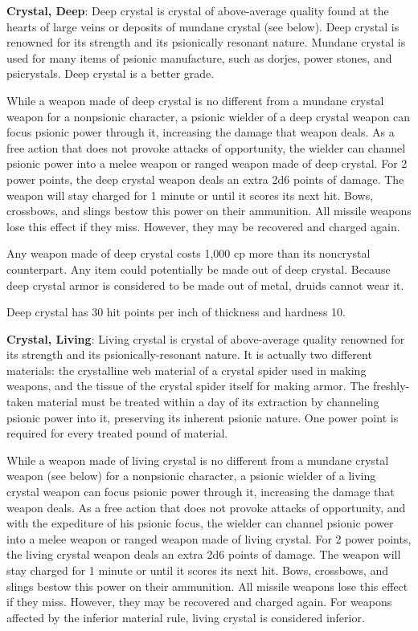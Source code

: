 \textbf{Crystal, Deep}: Deep crystal is crystal of above-average quality found at the hearts of large veins or deposits of mundane crystal (see below). Deep crystal is renowned for its strength and its psionically resonant nature. Mundane crystal is used for many items of psionic manufacture, such as dorjes, power stones, and psicrystals. Deep crystal is a better grade.

While a weapon made of deep crystal is no different from a mundane crystal weapon for a nonpsionic character, a psionic wielder of a deep crystal weapon can focus psionic power through it, increasing the damage that weapon deals. As a free action that does not provoke attacks of opportunity, the wielder can channel psionic power into a melee weapon or ranged weapon made of deep crystal. For 2 power points, the deep crystal weapon deals an extra 2d6 points of damage. The weapon will stay charged for 1 minute or until it scores its next hit. Bows, crossbows, and slings bestow this power on their ammunition. All missile weapons lose this effect if they miss. However, they may be recovered and charged again.

Any weapon made of deep crystal costs 1,000 cp more than its noncrystal counterpart. Any item could potentially be made out of deep crystal. Because deep crystal armor is considered to be made out of metal, druids cannot wear it.

Deep crystal has 30 hit points per inch of thickness and hardness 10.

\textbf{Crystal, Living}: Living crystal is crystal of above-average quality renowned for its strength and its psionically-resonant nature. It is actually two different materials: the crystalline web material of a crystal spider used in making weapons, and the tissue of the crystal spider itself for making armor. The freshly-taken material must be treated within a day of its extraction by channeling psionic power into it, preserving its inherent psionic nature. One power point is required for every treated pound of material.

While a weapon made of living crystal is no different from a mundane crystal weapon (see below) for a nonpsionic character, a psionic wielder of a living crystal weapon can focus psionic power through it, increasing the damage that weapon deals. As a free action that does not provoke attacks of opportunity, and with the expediture of his psionic focus, the wielder can channel psionic power into a melee weapon or ranged weapon made of living crystal. For 2 power points, the living crystal weapon deals an extra 2d6 points of damage. The weapon will stay charged for 1 minute or until it scores its next hit. Bows, crossbows, and slings bestow this power on their ammunition. All missile weapons lose this effect if they miss. However, they may be recovered and charged again. For weapons affected by the inferior material rule, living crystal is considered inferior.

